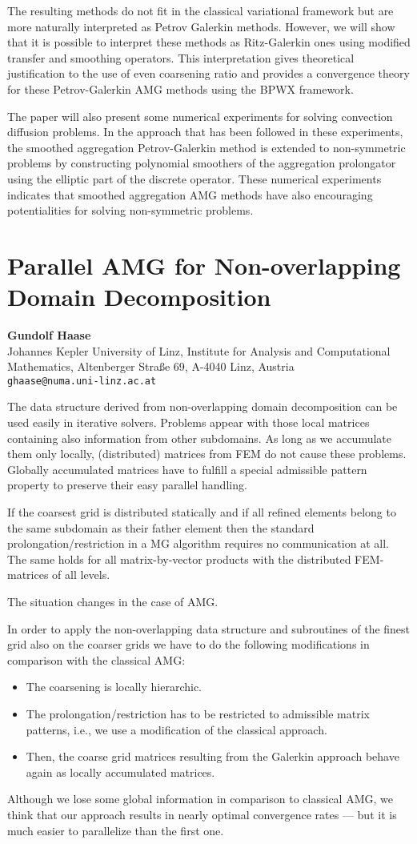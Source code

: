 \documentclass[11pt]{article}
\newcommand{\nextab}[4]{
	\section{#2}
	{\bf #1} \\ \nopagebreak
	{#3} \\ \nopagebreak
	{\tt #4} \nopagebreak
	}
\begin{document}
The resulting methods do not fit in the
classical variational framework but are more naturally interpreted as
Petrov Galerkin methods.
However, we will show that it is possible to interpret these methods
as Ritz-Galerkin ones
using modified transfer and smoothing operators.
This interpretation gives theoretical justification
to the use of even coarsening ratio and provides a convergence theory for
these Petrov-Galerkin AMG methods using the BPWX framework.

The paper will also present some numerical experiments for
solving convection diffusion problems. In the approach that has been
followed in these experiments, the smoothed aggregation
Petrov-Galerkin method is extended to non-symmetric problems by constructing
polynomial smoothers of the aggregation prolongator using the elliptic part
of the discrete operator. These numerical experiments indicates that smoothed
aggregation AMG methods have also encouraging potentialities for solving
non-symmetric problems.



\nextab{Gundolf Haase}
	{Parallel AMG for Non-overlapping Domain Decomposition}
	{Johannes Kepler University of Linz,
		Institute for Analysis and Computational Mathematics,
		Altenberger Stra{\ss}e 69, A-4040 Linz, Austria}
	{ghaase@numa.uni-linz.ac.at}

The data structure derived from non-overlapping domain decomposition
can be used easily in iterative solvers. Problems appear with those
local matrices containing also information from other subdomains. As long
as we accumulate them only locally, (distributed) matrices from FEM do
not cause these problems. Globally accumulated matrices have to fulfill
a special admissible pattern property to preserve their easy parallel handling.

If the coarsest grid is distributed statically and if all refined elements
belong to the same subdomain as their father element then the standard
prolongation/restriction in a MG algorithm requires no communication at
all. The same holds for all matrix-by-vector products with the distributed
FEM-matrices of all levels.

The situation changes in the case of AMG.

In order to apply the non-overlapping data structure and subroutines
of the finest grid also on the coarser grids we have to do the following
modifications in comparison with the classical AMG:
\begin{itemize}
\item
	The coarsening is locally hierarchic.
\item
	The prolongation/restriction has to be restricted to admissible matrix
	patterns, i.e., we use a modification of the classical approach.
\item
	Then, the coarse grid matrices resulting from the
	Galerkin approach behave again as locally accumulated matrices.
\end{itemize}
Although we lose some global information in comparison to classical AMG,
we think that our approach results in nearly optimal convergence rates
--- but it is much easier to parallelize than the first one.
\end{document}
